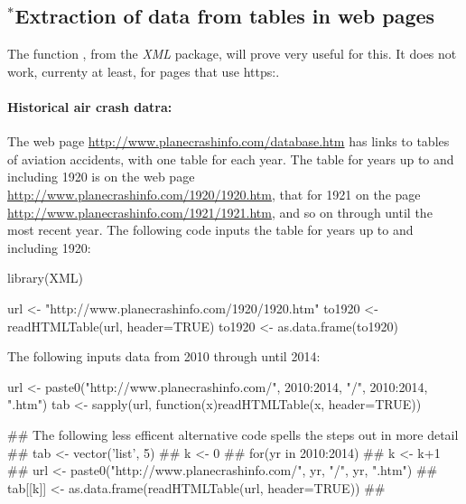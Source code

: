 \subsection*{$^*$Extraction of data from tables in web pages}

The function , from the {\em XML} package,
will prove very useful for this.  It does not work, currenty at
least, for pages that use https:.

\paragraph{Historical air crash datra:}
The web page \url{http://www.planecrashinfo.com/database.htm}
has links to tables of aviation accidents, with one table for
each year. The table for years up to and including 1920 is on
the web page \url{http://www.planecrashinfo.com/1920/1920.htm},
that for 1921 on the page \url{http://www.planecrashinfo.com/1921/1921.htm},
and so on through until the most recent year.  The following code
inputs the table for years up to and including 1920:

\begin{Schunk}
\begin{Sinput}
library(XML)
\end{Sinput}
\end{Schunk}

\begin{Schunk}
\begin{Sinput}
url <- "http://www.planecrashinfo.com/1920/1920.htm"
to1920 <- readHTMLTable(url, header=TRUE)
to1920 <- as.data.frame(to1920)
\end{Sinput}
\end{Schunk}

The following inputs data from 2010 through until 2014:
\begin{fullwidth}

\begin{Schunk}
\begin{Sinput}
url <- paste0("http://www.planecrashinfo.com/",
              2010:2014, "/", 2010:2014, ".htm")
tab <- sapply(url, function(x)readHTMLTable(x, header=TRUE))
\end{Sinput}
\end{Schunk}

\end{fullwidth}

{\small
\begin{fullwidth}

\begin{Schunk}
\begin{Sinput}
## The following less efficent alternative code spells the steps out in more detail
## tab <- vector('list', 5)
## k <- 0
## for(yr in 2010:2014){
##  k <- k+1
##  url <- paste0("http://www.planecrashinfo.com/", yr, "/", yr, ".htm")
##  tab[[k]] <- as.data.frame(readHTMLTable(url, header=TRUE))
## }
\end{Sinput}
\end{Schunk}

\end{fullwidth}
}

